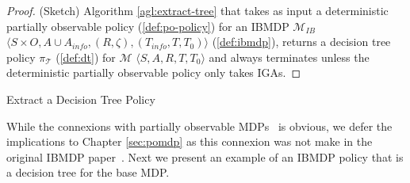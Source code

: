 \begin{proof}(Sketch) Algorithm \ref{agl:extract-tree} that takes as input a deterministic partially observable policy (\ref{def:po-policy}) for an IBMDP $\mathcal{M}_{IB}$ $\langle S \times O,A \cup A_{info}, (R, \zeta), (T_{info}, T, T_0)\rangle$ (\ref{def:ibmdp}), returns a decision tree policy $\pi_{\mathcal{T}}$ (\ref{def:dt}) for $\mathcal{M}$ $\langle S, A, R, T, T_0\rangle$ and always terminates unless the deterministic partially observable policy only takes IGAs.
\end{proof}

\begin{algorithm}[t]
    
    
    \caption{Extract a Decision Tree Policy}\label{alg:extract-tree}
\end{algorithm}

While the connexions with partially observable MDPs~\cite{POMDP,chap2} is obvious, we defer the implications to Chapter \ref{sec:pomdp} as this connexion was not make in the original IBMDP paper~\cite{topin2021iterative}.
Next we present an example of an IBMDP policy that is a decision tree for the base MDP.

